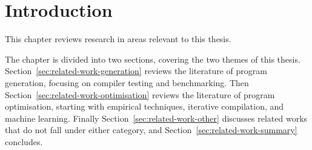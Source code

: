 \section{Introduction}

This chapter reviews research in areas relevant to this thesis.

The chapter is divided into two sections, covering the two themes of this thesis. Section~\ref{sec:related-work-generation} reviews the literature of program generation, focusing on compiler testing and benchmarking. Then Section~\ref{sec:related-work-optimisation} reviews the literature of program optimisation, starting with empirical techniques, iterative compilation, and machine learning. Finally Section~\ref{sec:related-work-other} discusses related works that do not fall under either category, and Section~\ref{sec:related-work-summary} concludes.